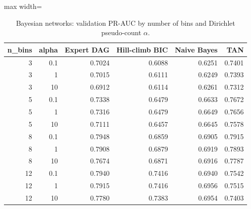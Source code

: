 \begin{table}[H]
\centering
\small
\begin{adjustbox}{max width=\linewidth}
\begin{tabular}{rrrrrr}
\toprule
n\_bins & alpha & Expert DAG & Hill-climb BIC & Naive Bayes & TAN \\
\midrule
3 & 0.1 & 0.7024 & 0.6088 & 0.6251 & 0.7401 \\
3 & 1 & 0.7015 & 0.6111 & 0.6249 & 0.7393 \\
3 & 10 & 0.6912 & 0.6114 & 0.6261 & 0.7312 \\
5 & 0.1 & 0.7338 & 0.6479 & 0.6633 & 0.7672 \\
5 & 1 & 0.7316 & 0.6479 & 0.6649 & 0.7656 \\
5 & 10 & 0.7111 & 0.6457 & 0.6645 & 0.7578 \\
8 & 0.1 & 0.7948 & 0.6859 & 0.6905 & 0.7915 \\
8 & 1 & 0.7908 & 0.6879 & 0.6919 & 0.7893 \\
8 & 10 & 0.7674 & 0.6871 & 0.6916 & 0.7787 \\
12 & 0.1 & 0.7940 & 0.7416 & 0.6940 & 0.7542 \\
12 & 1 & 0.7915 & 0.7416 & 0.6956 & 0.7515 \\
12 & 10 & 0.7780 & 0.7383 & 0.6954 & 0.7403 \\
\bottomrule
\end{tabular}
\end{adjustbox}
\caption{Bayesian networks: validation PR-AUC by number of bins and Dirichlet pseudo-count $\alpha$.}
\label{tab:bn_sens}
\end{table}
